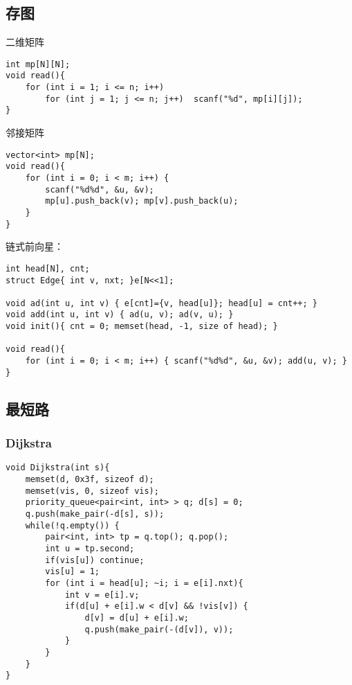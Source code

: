 \subsection{存图}

二维矩阵

\begin{lstlisting}
int mp[N][N];
void read(){
    for (int i = 1; i <= n; i++) 
        for (int j = 1; j <= n; j++)  scanf("%d", mp[i][j]);
}
\end{lstlisting}

邻接矩阵

\begin{lstlisting}
vector<int> mp[N];
void read(){
    for (int i = 0; i < m; i++) {
        scanf("%d%d", &u, &v);
        mp[u].push_back(v); mp[v].push_back(u);
    }
}
\end{lstlisting}

链式前向星：

\begin{lstlisting}
int head[N], cnt;
struct Edge{ int v, nxt; }e[N<<1];

void ad(int u, int v) { e[cnt]={v, head[u]}; head[u] = cnt++; }
void add(int u, int v) { ad(u, v); ad(v, u); }
void init(){ cnt = 0; memset(head, -1, size of head); }

void read(){
    for (int i = 0; i < m; i++) { scanf("%d%d", &u, &v); add(u, v); }
}
\end{lstlisting}

\subsection{最短路}

\subsubsection{Dijkstra}

\begin{lstlisting}
void Dijkstra(int s){
    memset(d, 0x3f, sizeof d);
    memset(vis, 0, sizeof vis);
    priority_queue<pair<int, int> > q; d[s] = 0;
    q.push(make_pair(-d[s], s));
    while(!q.empty()) {
        pair<int, int> tp = q.top(); q.pop();
        int u = tp.second;
        if(vis[u]) continue; 
        vis[u] = 1;
        for (int i = head[u]; ~i; i = e[i].nxt){
            int v = e[i].v;
            if(d[u] + e[i].w < d[v] && !vis[v]) {
                d[v] = d[u] + e[i].w;
                q.push(make_pair(-(d[v]), v));
            }
        }
    }
}
\end{lstlisting}

